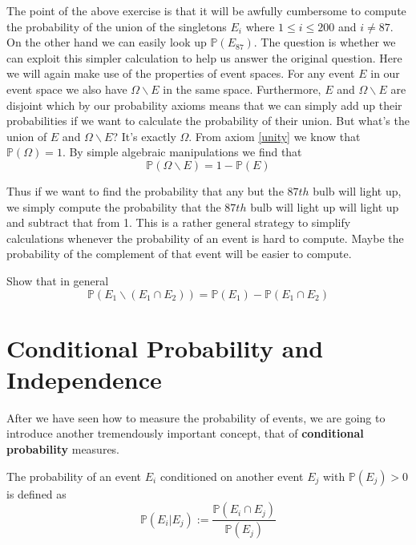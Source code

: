 The point of the above exercise is that it will be awfully cumbersome to compute the probability of the
union of the singletons $ {E_{i}} $ where $ 1 \leq i \leq 200 $ and $ i \not = 87 $. On the other hand
we can easily look up $ \mathbb{P}(E_{87}) $. The question is whether we can exploit this simpler calculation
to help us answer the original question. Here we will again make use of the properties of event spaces.
For any event $ E $ in our event space we also have $ \Omega \backslash E $ in the same space. Furthermore,
$ E $ and $ \Omega \backslash E $ are disjoint which by our probability axioms means that we can simply add
up their probabilities if we want to calculate the probability of their union. But what's the union
of $ E $ and $ \Omega \backslash E $? It's exactly $ \Omega $. From axiom \ref{unity} we know that 
$ \mathbb{P}(\Omega) = 1 $. By simple algebraic manipulations we find that 
\begin{equation}
\mathbb{P}(\Omega \backslash E) = 1 - \mathbb{P}(E)
\end{equation}

Thus if we want to find the probability that any but the $ 87th $ bulb will light up, we simply compute
the probability that the $ 87th $ bulb will light up will light up and subtract that from 1. This is a rather 
general strategy to simplify calculations whenever the probability of an event is hard to compute. 
Maybe the probability of the complement of that event will be easier to compute.

\begin{Exercise}
Show that in general $$ \mathbb{P}(E_{1}\backslash (E_{1}\cap E_{2})) 
= \mathbb{P}(E_{1}) - \mathbb{P}(E_{1}\cap E_{2}) $$
\end{Exercise}

\section{Conditional Probability and Independence}
After we have seen how to measure the probability of events, we are going to introduce another
tremendously important concept, that of \textbf{conditional probability} measures.

\begin{Definition}
The probability of an event $ E_{i} $ conditioned on another event $ E_{j} $ with $ \mathbb{P}(E_{j}) > 0 $ 
is defined as $$ \mathbb{P}(E_{i}|E_{j}) := \dfrac{\mathbb{P}(E_{i} \cap E_{j})}{\mathbb{P}(E_{j})} $$
\label{condProb}
\end{Definition}

